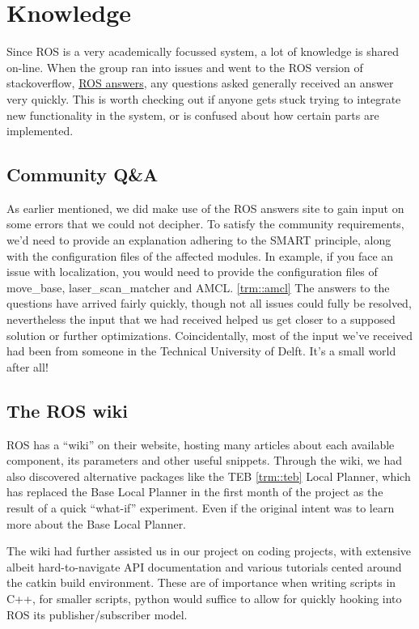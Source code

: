 \section{Knowledge}
Since ROS is a very academically focussed system, a lot of knowledge is shared on-line.
When the group ran into issues and went to the ROS version of stackoverflow, \href{https://answers.ros.org/questions/}{ROS answers}, any questions asked generally received an answer very quickly.
This is worth checking out if anyone gets stuck trying to integrate new functionality in the system, or is confused about how certain parts are implemented.

\subsection{Community Q\&A}
As earlier mentioned, we did make use of the ROS answers site to gain input on some errors that we could not decipher. 
To satisfy the community requirements, we'd need to provide an explanation adhering to the SMART principle, along with the configuration files of the affected modules.
In example, if you face an issue with localization, you would need to provide the configuration files of move\_base, laser\_scan\_matcher and AMCL. \ref{trm::amcl}
The answers to the questions have arrived fairly quickly, though not all issues could fully be resolved, nevertheless the input that we had received helped us get closer to a supposed solution or further optimizations. 
Coincidentally, most of the input we've received had been from someone in the Technical University of Delft. It's a small world after all!

\subsection{The ROS wiki}
ROS has a ``wiki'' \cite{site_ros_wiki} on their website, hosting many articles about each available component, its parameters and other useful snippets. 
Through the wiki, we had also discovered alternative packages like the TEB \ref{trm::teb} Local Planner, which has replaced the Base Local Planner in the first month of the project as the result of a quick  ``what-if'' experiment. 
Even if the original intent was to learn more about the Base Local Planner.

The wiki had further assisted us in our project on coding projects, with extensive albeit hard-to-navigate API documentation and various tutorials cented around the catkin build environment. 
These are of importance when writing scripts in C++, for smaller scripts, python would suffice to allow for quickly hooking into ROS its publisher/subscriber model.

